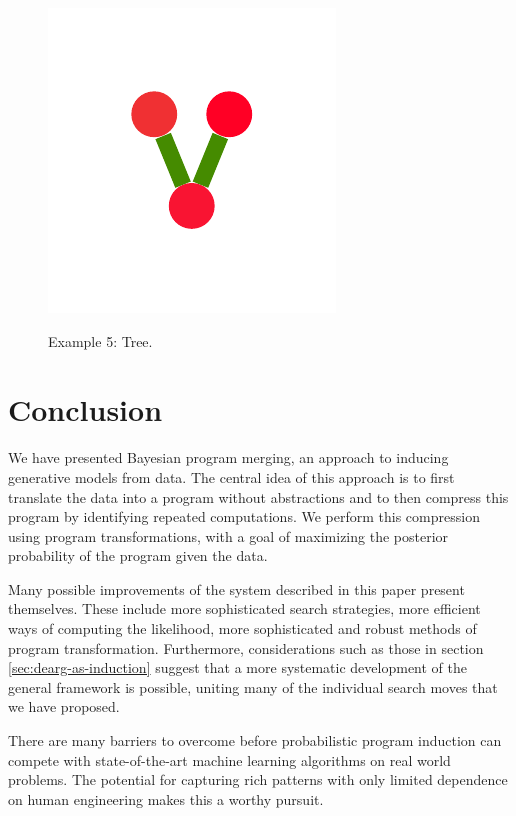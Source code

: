 \documentclass[a4paper,10pt]{article}
\begin{document}
\begin{figure}
{    \includegraphics[scale=.16]{../figures/vector/6-5-tree-induced-19.pdf}    
    \label{fig:exp-tree-induced}    
    }
  \caption{Example 5: Tree.}
  \label{fig:exp-tree}
\end{figure}

\newpage
\section{Conclusion}
We have presented Bayesian program merging, an approach to inducing generative models from data. The central idea of this approach is to first translate the data into a program without abstractions and to then compress this program by identifying repeated computations. We perform this compression using program transformations, with a goal of maximizing the posterior probability of the program given the data.

Many possible improvements of the system described in this paper present themselves. These include more sophisticated search strategies, more efficient ways of computing the likelihood, more sophisticated and robust methods of program transformation.
Furthermore, considerations such as those in section \ref{sec:dearg-as-induction} suggest that a more systematic development of the general framework is possible, uniting many of the individual search moves that we have proposed.


There are many barriers to overcome before probabilistic program induction can compete with state-of-the-art machine learning algorithms on real world problems. The potential for capturing rich patterns with only limited dependence on human engineering makes this a worthy pursuit.

\newpage


\end{document}
